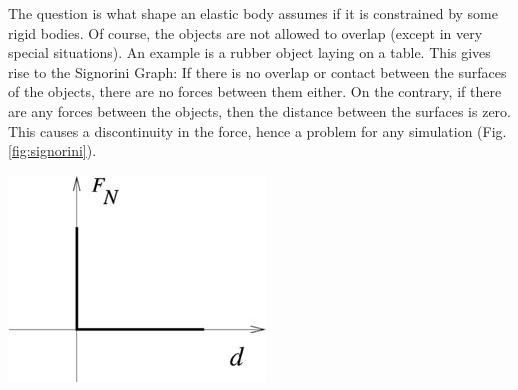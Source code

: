\vspace{0.2cm}
\noindent
\begin{minipage}{\textwidth}
\begin{minipage}{0.48\textwidth}
The question is what shape an elastic body assumes if it is constrained by some rigid bodies. Of course, the objects are not allowed to overlap (except in very special situations). An example is a rubber object laying on a table. This gives rise to the Signorini Graph: If there is no overlap or contact between the surfaces of the objects, there are no  forces between them either. On the contrary, if there are any forces between the objects, then the distance between the surfaces is zero. This causes a discontinuity in the force, hence a problem for any simulation (Fig. \ref{fig:signorini}).
\end{minipage}
\hfill
\begin{minipage}{.5\textwidth}
  \centering
  \includegraphics[width=.75\textwidth]{pics/signorini.jpeg}
  \label{fig:signorini}
\end{minipage}
\end{minipage}
\vspace{0.1cm}


